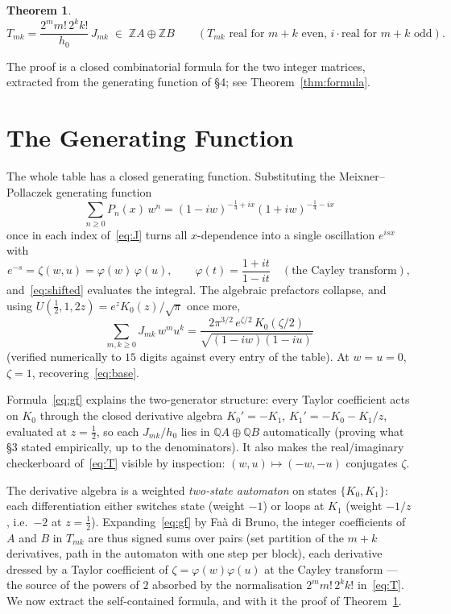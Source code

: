 \documentclass[11pt,a4paper]{article}
\newtheorem{theorem}[proposition]{Theorem}
\newcommand{\Z}{\mathbb{Z}}
\newcommand{\Q}{\mathbb{Q}}
\begin{document}
\begin{theorem}\label{thm:integrality}
\begin{equation}\label{eq:T}
  T_{mk} = \frac{2^m m!\, 2^k k!}{h_0}\, J_{mk}
  \;\in\; \Z A \oplus \Z B
  \qquad (\text{$T_{mk}$ real for $m+k$ even, } i \cdot \text{real
  for $m+k$ odd}).
\end{equation}
\end{theorem}

\noindent
The proof is a closed combinatorial formula for the two integer
matrices, extracted from the generating function of \S4; see
Theorem~\ref{thm:formula}.

\section{The Generating Function}

The whole table has a closed generating function. Substituting the
Meixner--Pollaczek generating function
\[
  \sum_{n \ge 0} P_n(x)\, w^n
  = (1-iw)^{-\frac14+ix} (1+iw)^{-\frac14-ix}
\]
once in each index of~\eqref{eq:J} turns all $x$-dependence into a
single oscillation $e^{isx}$ with
\[
  e^{-s} = \zeta(w,u) = \varphi(w)\,\varphi(u),
  \qquad
  \varphi(t) = \frac{1+it}{1-it}
  \quad (\text{the Cayley transform}),
\]
and~\eqref{eq:shifted} evaluates the integral. The algebraic
prefactors collapse, and using
$U(\tfrac12, 1, 2z) = e^{z} K_0(z)/\sqrt{\pi}$ once more,
\begin{equation}\label{eq:gf}
  \sum_{m,k \ge 0} J_{mk}\, w^m u^k
  = \frac{2\pi^{3/2}\, e^{\zeta/2}\, K_0(\zeta/2)}
         {\sqrt{(1-iw)(1-iu)}}
\end{equation}
(verified numerically to $15$ digits against every entry of the
table). At $w = u = 0$, $\zeta = 1$, recovering~\eqref{eq:base}.

Formula~\eqref{eq:gf} explains the two-generator structure: every
Taylor coefficient acts on $K_0$ through the closed derivative algebra
$K_0' = -K_1$, $K_1' = -K_0 - K_1/z$, evaluated at $z = \tfrac12$, so
each $J_{mk}/h_0$ lies in $\Q A \oplus \Q B$ automatically (proving
what \S3 stated empirically, up to the denominators). It also makes
the real/imaginary checkerboard of~\eqref{eq:T} visible by inspection:
$(w,u) \mapsto (-w,-u)$ conjugates $\zeta$.

The derivative algebra is a weighted \emph{two-state automaton} on
states $\{K_0, K_1\}$: each differentiation either switches state
(weight $-1$) or loops at $K_1$ (weight $-1/z$, i.e.\ $-2$ at
$z = \tfrac12$). Expanding~\eqref{eq:gf} by Fa\`a di Bruno, the
integer coefficients of $A$ and $B$ in $T_{mk}$ are thus signed sums
over pairs (set partition of the $m+k$ derivatives, path in the
automaton with one step per block), each derivative dressed by a
Taylor coefficient of $\zeta = \varphi(w)\varphi(u)$ at the Cayley
transform --- the source of the powers of $2$ absorbed by the
normalisation $2^m m!\, 2^k k!$ in~\eqref{eq:T}. We now extract the
self-contained formula, and with it the proof of
Theorem~\ref{thm:integrality}.
\end{document}
